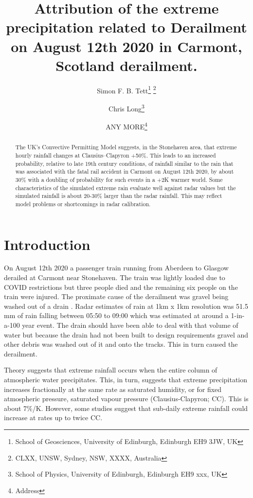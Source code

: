 \documentclass[11pt,a4paper]{article}
\title{Attribution of the  extreme precipitation related to Derailment  on August 12th 2020 in Carmont, Scotland derailment.}
\author{Simon F. B. Tett\thanks{School of Geosciences, University of Edinburgh, Edinburgh EH9 3JW, UK} \thanks{CLXX, UNSW, Sydney, NSW, XXXX, Australia}
	\and 
Chris Long\thanks{School of Physics, University of Edinburgh, Edinburgh EH9 xxx, UK}
\and 
ANY MORE\thanks{Address}}
\begin{document}
	
\maketitle

\graphicspath{{../figures/}}


\begin{abstract}

	The UK's Convective Permitting Model suggests, in the Stonehaven area, that extreme hourly rainfall changes at Clausius–Clapyron +50\%. This leads to an increased probability, relative to late 19th century conditions,  of rainfall similar to the rain that was associated with the fatal rail accident in Carmont on August 12th 2020, by about 30\% with a doubling of probability for such events in a +2K warmer world. Some characteristics of the simulated extreme rain evaluate well against radar values but the  simulated rainfall is about 20-30\% larger than the radar rainfall. This may reflect model problems or shortcomings in  radar  calibration. 
\end{abstract}



\section{Introduction}
\label{sect:Intro}

On August 12th 2020 a passenger train running from Aberdeen to Glasgow derailed at Carmont near Stonehaven. The train was lightly loaded due to COVID restrictions but three people died and the remaining six people on the train  were injured. The proximate cause of the derailment was gravel being washed out of a drain \parencite{carmontReport2024}. Radar estimates of  rain at 1km x 1km resolution was 51.5 mm of rain falling between 05:50 to 09:00 which was estimated at around a 1-in-a-100 year event. The drain should have been able to deal with that volume of water but because the drain had not been built to design requirements gravel and other debris was washed out of it and onto the tracks. This in turn caused the derailment.

Theory\parencite{allen02insight} suggests that extreme rainfall occurs when the entire column of atmospheric water precipitates. This, in turn,  suggests that extreme precipitation increases fractionally at the same rate as saturated humidity, or for fixed atmospheric pressure, saturated vapour pressure (Clausius-Clapyron; CC). This is about 7\%/K. However, some studies suggest that sub-daily extreme rainfall  could increase  at rates  up to twice CC\parencite{kendon2023uk_cpm}.
\end{document}
